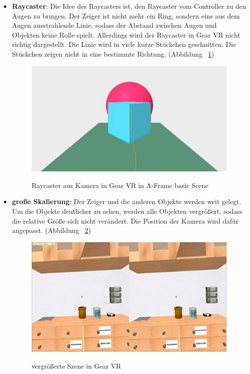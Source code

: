   \begin{itemize}
      \item \textbf{Raycaster}: Die Idee des Raycasters ist, den Raycaster vom Controller zu den Augen zu bringen. Der Zeiger ist nicht mehr ein Ring, sondern eins aus dem Augen ausstrahlende Linie, sodass der Abstand zwischen Augen und Objekten keine Rolle spielt. Allerdings wird der Raycaster in Gear VR nicht richtig dargestellt. Die Linie wird in viele kurze Stückchen geschnitten. Die Stückchen zeigen nicht in eine bestimmte Richtung. (Abbildung ~\ref{fig:GearVRRaycaster})
      
\begin{figure}[ht]
\vspace*{2.5em}
\centering
\caption[Raycaster in Gear VR]{Raycaster aus Kamera in Gear VR in A-Frame basic Scene}
\includegraphics[width=\textwidth]{images/gearVRRaycaster.png}
\label{fig:GearVRRaycaster} 
\vspace*{1.5em}
\end{figure}
      
      \item \textbf{große Skalierung}: Der Zeiger und die anderen Objekte werden weit gelegt. Um die Objekte deutlicher zu sehen, werden alle Objekten vergrößert, sodass die relative Größe sich nicht verändert. Die Position der Kamera wird dafür angepasst.
      (Abbildung ~\ref{fig:GearVRCursor})
      
\begin{figure}[t]
\vspace*{1em}
\centering
\caption[vergrößerte Szene in Gear VR]{vergrößerte Szene in Gear VR}
\includegraphics[width=\textwidth]{images/gearVRCursor.png}
\label{fig:GearVRCursor} 
\end{figure}
      
  \end{itemize}
  
